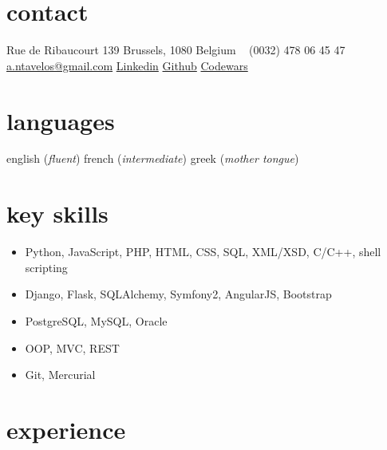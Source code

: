 \documentclass[]{friggeri-cv} %
\begin{document}


\begin{aside} %
\section{contact}
Rue de Ribaucourt 139
Brussels, 1080
Belgium
~
(0032) 478 06 45 47
~
\href{mailto:a.ntavelos@gmail.com}{a.ntavelos@gmail.com}
\href{http://www.linkedin.com/in/antavelos}{Linkedin}
\href{https://github.com/antavelos}{Github}
\href{http://www.codewars.com/users/dvc}{Codewars}
\section{languages}
english (\textit{fluent})
french (\textit{intermediate})
greek (\textit{mother tongue})
\end{aside}


\section{key skills}
\begin{itemize}
\item Python, JavaScript, PHP, HTML, CSS, SQL, XML/XSD, C/C++, shell scripting
\item Django, Flask, SQLAlchemy, Symfony2, AngularJS, Bootstrap
\item PostgreSQL, MySQL, Oracle
\item OOP, MVC, REST
\item Git, Mercurial
\end{itemize}

\section{experience}
\end{document}
